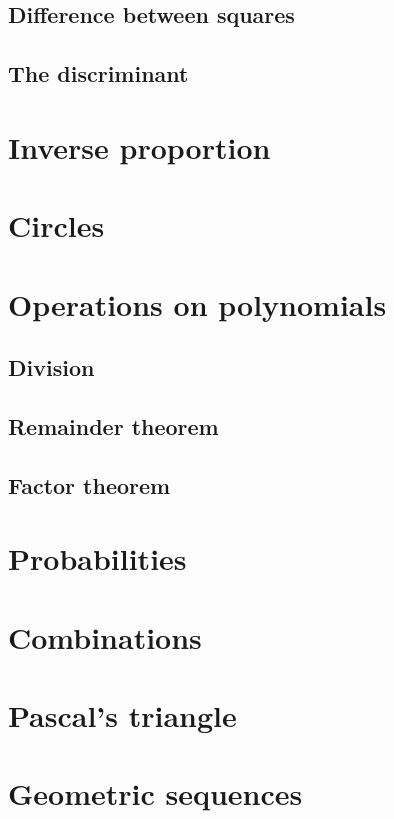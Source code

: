 \documentclass[a4paper,10pt]{report}
\begin{document}
\subsection{Difference between squares}

\subsection{The discriminant}

\section{Inverse proportion}

\section{Circles}

\section{Operations on polynomials}
\subsection{Division}

\subsection{Remainder theorem}

\subsection{Factor theorem}

\section{Probabilities}

\section{Combinations}

\section{Pascal's triangle}

\section{Geometric sequences}
\end{document}
